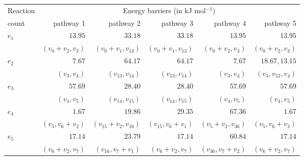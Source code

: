 \begin{table}[!h]
    \centering
    \vspace{1cm}
    \begin{footnotesize}
    \begin{adjustbox}{angle=90}
    \begin{tabular}{lrrrrr}
        \toprule
        Reaction\hspace{0.2cm} & \multicolumn{5}{c}{Energy barriers (in kJ mol$^{-1}$)} \\
        count & \hspace{1cm}\textcolor{myBlue}{pathway 1} & \hspace{1cm}\textcolor{myGreen}{pathway 2} & \hspace{1cm}\textcolor{myBrown}{pathway 3} & \hspace{1cm}\textcolor{myCyan}{pathway 4} & \hspace{1cm}\textcolor{myBlue2}{pathway 5} \\
        \midrule
        \multirow{2}{*}{$e_1$} & $13.95$ & $33.18$ & \cellcolor{mygray}$33.18$ & \cellcolor{mygray}$13.95$ & \cellcolor{mygray}$13.95$\\
        & $(v_0+v_2, v_3)$ & $(v_0+v_1, v_{13})$ & \cellcolor{mygray}$(v_0+v_1, v_{13})$ & \cellcolor{mygray}$(v_0+v_2, v_3)$ & \cellcolor{mygray}$(v_0+v_2, v_3)$  \\
        \multirow{2}{*}{$e_2$} & $7.67$ & $64.17$ & \cellcolor{mygray}$64.17$ & \cellcolor{mygray}$7.67$ & $18.67, 13.15$\\
        & $(v_3, v_4)$ & $(v_{13}, v_{14})$ & \cellcolor{mygray}$(v_{13}, v_{14})$ & \cellcolor{mygray}$(v_3, v_4)$ & $(v_3, v_{52}, v_4)$ \\
        \multirow{2}{*}{$e_3$} & $57.69$ & $28.40$ & \cellcolor{mygray}$28.40$ & \cellcolor{mygray}$57.69$ & \cellcolor{mygray}$57.69$\\
        & $(v_4, v_5)$ & $(v_{14}, v_{15})$ & \cellcolor{mygray}$(v_{14}, v_{15})$ & \cellcolor{mygray}$(v_4, v_5)$ & \cellcolor{mygray}$(v_4, v_5)$\\
        \multirow{2}{*}{$e_4$} & $1.67$ & $19.86$ & $29.35$ & $67.36$ & \cellcolor{mygray}$1.67$\\
        & $(v_5, v_6+v_2)$ & $(v_{15}+v_2, v_{16})$ & $(v_{15}, v_6+v_1)$ & $(v_5+v_2, v_{36})$ & \cellcolor{mygray}$(v_5, v_6+v_2)$\\
        \multirow{2}{*}{$e_5$} & $17.14$ & $23.79$ & \cellcolor{mygray}$17.14$ & $60.84$ & \cellcolor{mygray}$17.14$ \\\
        & $(v_6+v_2, v_7)$ & $(v_{16}, v_7+v_1)$ & \cellcolor{mygray}$(v_6+v_2, v_7)$& $(v_{36}, v_7+v_2)$ & \cellcolor{mygray}$(v_6+v_2, v_7)$\\

\end{tabular}
\end{adjustbox}
\end{footnotesize}
\end{table}
